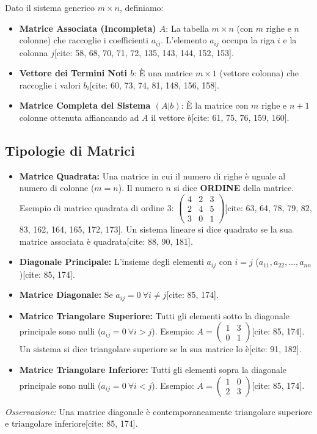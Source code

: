 \documentclass[11pt,a4paper]{article}
\begin{document}
\begin{definition}
Dato il sistema generico $m \times n$, definiamo:
\begin{itemize}
    \item \textbf{Matrice Associata (Incompleta) $A$}: La tabella $m \times n$ (con $m$ righe e $n$ colonne) che raccoglie i coefficienti $a_{ij}$. L'elemento $a_{ij}$ occupa la riga $i$ e la colonna $j$[cite: 58, 68, 70, 71, 72, 135, 143, 144, 152, 153].
    \item \textbf{Vettore dei Termini Noti $b$}: È una matrice $m \times 1$ (vettore colonna) che raccoglie i valori $b_i$[cite: 60, 73, 74, 81, 148, 156, 158].
    \item \textbf{Matrice Completa del Sistema $(A|b)$}: È la matrice con $m$ righe e $n+1$ colonne ottenuta affiancando ad $A$ il vettore $b$[cite: 61, 75, 76, 159, 160].
\end{itemize}
\end{definition}

\subsection{Tipologie di Matrici}
\begin{itemize}
    \item \textbf{Matrice Quadrata:} Una matrice in cui il numero di righe è uguale al numero di colonne ($m=n$). Il numero $n$ si dice \textbf{ORDINE} della matrice. Esempio di matrice quadrata di ordine 3: $\begin{pmatrix} 4 & 2 & 3 \\ 2 & 4 & 5 \\ 3 & 0 & 1 \end{pmatrix}$[cite: 63, 64, 78, 79, 82, 83, 162, 164, 165, 172, 173]. Un sistema lineare si dice quadrato se la sua matrice associata è quadrata[cite: 88, 90, 181].
    \item \textbf{Diagonale Principale:} L'insieme degli elementi $a_{ij}$ con $i = j$ ($a_{11}, a_{22}, \dots, a_{nn}$)[cite: 85, 174].
    \item \textbf{Matrice Diagonale:} Se $a_{ij} = 0 \ \forall i \neq j$[cite: 85, 174].
    \item \textbf{Matrice Triangolare Superiore:} Tutti gli elementi sotto la diagonale principale sono nulli ($a_{ij} = 0 \ \forall i > j$). Esempio: $A = \begin{pmatrix} 1 & 3 \\ 0 & 1 \end{pmatrix}$[cite: 85, 174]. Un sistema si dice triangolare superiore se la sua matrice lo è[cite: 91, 182].
    \item \textbf{Matrice Triangolare Inferiore:} Tutti gli elementi sopra la diagonale principale sono nulli ($a_{ij} = 0 \ \forall i < j$). Esempio: $A = \begin{pmatrix} 1 & 0 \\ 2 & 3 \end{pmatrix}$[cite: 85, 174].
\end{itemize}
\textit{Osservazione:} Una matrice diagonale è contemporaneamente triangolare superiore e triangolare inferiore[cite: 85, 174].
\end{document}
